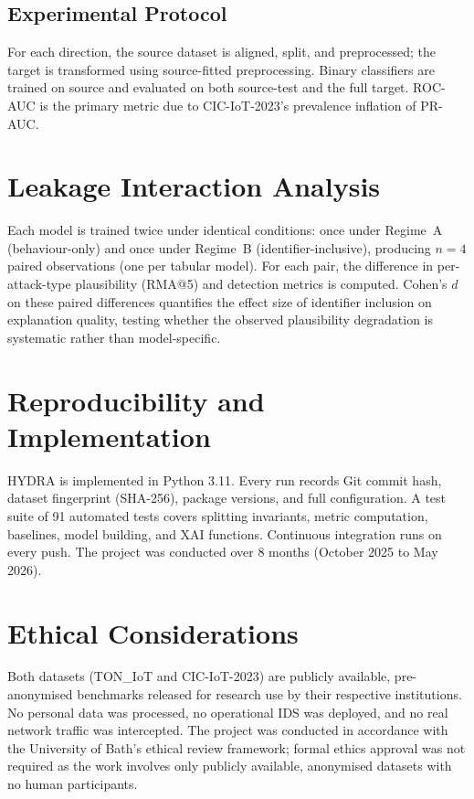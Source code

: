 \documentclass[12pt,a4paper]{report}
\begin{document}
\subsection{Experimental Protocol}
\label{sec:cross-protocol}

For each direction, the source dataset is aligned, split, and preprocessed; the target is transformed using source-fitted preprocessing. Binary classifiers are trained on source and evaluated on both source-test and the full target. ROC-AUC is the primary metric due to CIC-IoT-2023's prevalence inflation of PR-AUC.

\section{Leakage Interaction Analysis}
\label{sec:leakage-interaction}

Each model is trained twice under identical conditions: once under Regime~A (behaviour-only) and once under Regime~B (identifier-inclusive), producing $n = 4$ paired observations (one per tabular model). For each pair, the difference in per-attack-type plausibility (RMA@5) and detection metrics is computed. Cohen's $d$ on these paired differences quantifies the effect size of identifier inclusion on explanation quality, testing whether the observed plausibility degradation is systematic rather than model-specific.

\section{Reproducibility and Implementation}
\label{sec:implementation}

HYDRA is implemented in Python 3.11. Every run records Git commit hash, dataset fingerprint (SHA-256), package versions, and full configuration. A test suite of 91 automated tests covers splitting invariants, metric computation, baselines, model building, and XAI functions. Continuous integration runs on every push. The project was conducted over 8 months (October 2025 to May 2026).

\section{Ethical Considerations}
\label{sec:ethics}

Both datasets (TON\_IoT and CIC-IoT-2023) are publicly available, pre-anonymised benchmarks released for research use by their respective institutions. No personal data was processed, no operational IDS was deployed, and no real network traffic was intercepted. The project was conducted in accordance with the University of Bath's ethical review framework; formal ethics approval was not required as the work involves only publicly available, anonymised datasets with no human participants.
\end{document}
